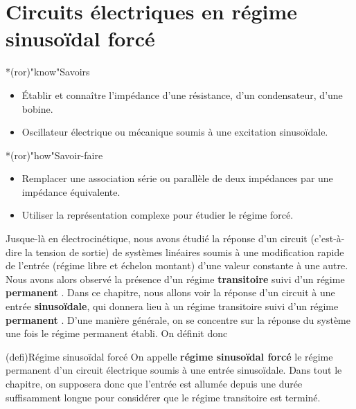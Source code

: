 \documentclass[../../main/main.tex]{subfiles}
\begin{document}
\setcounter{chapter}{4}

\chapter{Circuits \'electriques en r\'egime sinuso\"idal forc\'e}

\vfill

\begin{prgm}
	\begin{tcb}*(ror)"know"{Savoirs}
		\begin{itemize}[label=$\diamond$, leftmargin=10pt]
			\item Établir et connaître l'impédance d'une résistance, d'un
			      condensateur, d'une bobine.
			\item Oscillateur électrique ou mécanique soumis à une excitation
			      sinusoïdale.
		\end{itemize}
	\end{tcb}

	\begin{tcb}*(ror)"how"{Savoir-faire}
		\begin{itemize}[label=$\diamond$, leftmargin=10pt]
			\item Remplacer une association série ou parallèle de deux impédances par
			      une impédance équivalente.
			\item Utiliser la représentation complexe pour étudier le régime forcé.
		\end{itemize}
	\end{tcb}
\end{prgm}

\vfill
\minitoc
\vfill

\newpage

Jusque-là en électrocinétique, nous avons étudié la réponse d'un circuit
(c'est-à-dire la tension de sortie) de systèmes linéaires soumis à une
modification rapide de l'entrée (régime libre et échelon montant) d'une valeur
constante à une autre. Nous avons alors observé la présence d'un régime
\textbf{transitoire} suivi d'un régime \textbf{permanent }.
Dans ce chapitre, nous allons voir la réponse d'un circuit à une entrée
\textbf{sinusoïdale}, qui donnera lieu à un régime transitoire suivi d'un régime
\textbf{permanent }. D'une manière générale, on se
concentre sur la réponse du système une fois le régime permanent établi. On
définit donc

\begin{tcb}[label=def:rsf](defi){Régime sinusoïdal forcé}
	On appelle \textbf{régime sinusoïdal forcé} le régime permanent d'un circuit
	électrique soumis à une entrée sinusoïdale.
	\smallbreak
	Dans tout le chapitre, on supposera donc que l'entrée est allumée depuis une
	durée suffisamment longue pour considérer que le régime transitoire est
	terminé.
\end{tcb}
\end{document}
